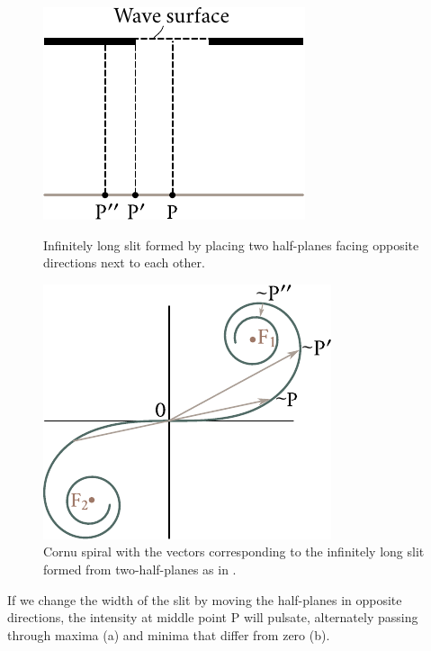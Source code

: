 \begin{figure}[!htb]
	\begin{minipage}[t]{0.48\linewidth}
		\begin{center}
			\includegraphics[scale=1]{figures/ch_18/fig_18_23.pdf}
            \caption[]{Infinitely long slit formed by placing two half-planes facing opposite directions next to each other.}
			\label{fig:18_23}
		\end{center}
	\end{minipage}
	\hfill{ }%
	\begin{minipage}[t]{0.48\linewidth}
		\begin{center}
			\includegraphics[scale=1]{figures/ch_18/fig_18_24.pdf}
			\caption[]{Cornu spiral with the vectors corresponding to the infinitely long slit formed from two-half-planes as in .}
			\label{fig:18_24}
		\end{center}
	\end{minipage}
\vspace{-0.4cm}
\end{figure}

If we change the width of the slit by moving the half-planes in opposite directions, the intensity at middle point P will pulsate, alternately passing through maxima (a) and minima that differ from zero (b).

